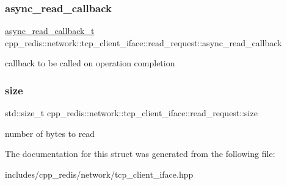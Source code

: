 \subsubsection{\texorpdfstring{async\+\_\+read\+\_\+callback}{async\_read\_callback}}
{\footnotesize\ttfamily \hyperlink{classcpp__redis_1_1network_1_1tcp__client__iface_ae8bf79e8e1f1d7e359ed1c7cdc4026fc}{async\+\_\+read\+\_\+callback\+\_\+t} cpp\+\_\+redis\+::network\+::tcp\+\_\+client\+\_\+iface\+::read\+\_\+request\+::async\+\_\+read\+\_\+callback}

callback to be called on operation completion \mbox{\label{structcpp__redis_1_1network_1_1tcp__client__iface_1_1read__request_a5ff8258391c9b3c8d2ce1a5c5a0304be}} 
\subsubsection{\texorpdfstring{size}{size}}
{\footnotesize\ttfamily std\+::size\+\_\+t cpp\+\_\+redis\+::network\+::tcp\+\_\+client\+\_\+iface\+::read\+\_\+request\+::size}

number of bytes to read 

The documentation for this struct was generated from the following file\+:\begin{DoxyCompactItemize}
\item 
includes/cpp\+\_\+redis/network/tcp\+\_\+client\+\_\+iface.\+hpp\end{DoxyCompactItemize}
